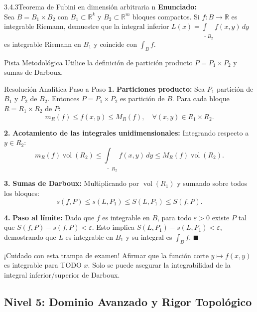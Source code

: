 \documentclass[11pt,a4paper]{article}
\begin{document}
\begin{nivelbox}{3.4.3}{Teorema de Fubini en dimensión arbitraria n}
\textbf{Enunciado:}\\
Sea $B = B_1 \times B_2$ con $B_1 \subset \mathbb{R}^k$ y $B_2 \subset \mathbb{R}^m$ bloques compactos. Si $f: B \to \mathbb{R}$ es integrable Riemann, demuestre que la integral inferior $L(x) = \underline{\int}_{B_2} f(x, y) \, dy$ es integrable Riemann en $B_1$ y coincide con $\int_B f$.

\begin{observacionbox}{Pista Metodológica}
Utilice la definición de partición producto $P = P_1 \times P_2$ y sumas de Darboux.
\end{observacionbox}

\begin{ejerciciobox}{Resolución Analítica Paso a Paso}
\smallskip\noindent\textbf{1.} \textbf{Particiones producto:}
Sea $P_1$ partición de $B_1$ y $P_2$ de $B_2$. Entonces $P = P_1 \times P_2$ es partición de $B$.
Para cada bloque $R = R_1 \times R_2$ de $P$:
\[m_R(f) \le f(x, y) \le M_R(f), \quad \forall (x,y) \in R_1 \times R_2.\]

\smallskip\noindent\textbf{2.} \textbf{Acotamiento de las integrales unidimensionales:}
Integrando respecto a $y \in R_2$:
\[m_R(f) \operatorname{vol}(R_2) \le \underline{\int}_{R_2} f(x, y) \, dy \le M_R(f) \operatorname{vol}(R_2).\]

\smallskip\noindent\textbf{3.} \textbf{Sumas de Darboux:}
Multiplicando por $\operatorname{vol}(R_1)$ y sumando sobre todos los bloques:
\[s(f, P) \le s(L, P_1) \le S(L, P_1) \le S(f, P).\]

\smallskip\noindent\textbf{4.} \textbf{Paso al límite:}
Dado que $f$ es integrable en $B$, para todo $\varepsilon > 0$ existe $P$ tal que $S(f, P) - s(f, P) < \varepsilon$.
Esto implica $S(L, P_1) - s(L, P_1) < \varepsilon$, demostrando que $L$ es integrable en $B_1$ y su integral es $\int_B f$. $\blacksquare$
\end{ejerciciobox}

\begin{errorbox}{¡Cuidado con esta trampa de examen!}
Afirmar que la función corte $y \mapsto f(x,y)$ es integrable para TODO $x$. Solo se puede asegurar la integrabilidad de la integral inferior/superior de Darboux.
\end{errorbox}
\end{nivelbox}
\bigskip

\subsection{Nivel 5: Dominio Avanzado y Rigor Topológico}
\end{document}
